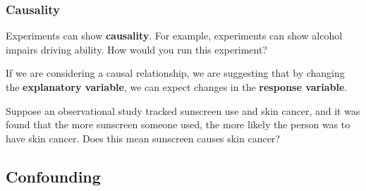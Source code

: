 \begin{frame}
\frametitle{Causality}
Experiments can show {\bf causality}. For example, experiments can show alcohol impairs driving ability. How would you run this experiment?

\pause
If we are considering a causal relationship, we are suggesting that by changing the {\bf explanatory variable}, we can expect changes in the {\bf response variable}.
\pause
{} \pause
{} \pause
{} \pause
{}


\end{frame}


\begin{frame}
Suppose an observational study tracked sunscreen use and skin cancer, and it was found that the more sunscreen someone used, the more likely the person was to have skin cancer. Does this mean sunscreen causes skin cancer?
\pause
{}
\pause
{}
\pause

\vspace{10pt}
\pause
{}
\pause

\vspace{10pt}
\pause
{}

\end{frame}






\subsection{Confounding}


